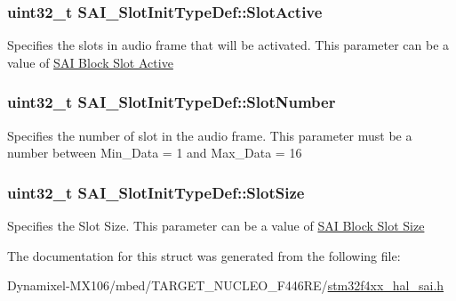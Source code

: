 \subsubsection[{\texorpdfstring{Slot\+Active}{SlotActive}}]{\setlength{\rightskip}{0pt plus 5cm}uint32\+\_\+t S\+A\+I\+\_\+\+Slot\+Init\+Type\+Def\+::\+Slot\+Active}\hypertarget{struct_s_a_i___slot_init_type_def_ab507a029fad3a8a181d87c4d603b9952}{}\label{struct_s_a_i___slot_init_type_def_ab507a029fad3a8a181d87c4d603b9952}
Specifies the slots in audio frame that will be activated. This parameter can be a value of \hyperlink{group___s_a_i___block___slot___active}{S\+AI Block Slot Active} 
\subsubsection[{\texorpdfstring{Slot\+Number}{SlotNumber}}]{\setlength{\rightskip}{0pt plus 5cm}uint32\+\_\+t S\+A\+I\+\_\+\+Slot\+Init\+Type\+Def\+::\+Slot\+Number}\hypertarget{struct_s_a_i___slot_init_type_def_a476fd97f54e692d634222720d4d4ad6a}{}\label{struct_s_a_i___slot_init_type_def_a476fd97f54e692d634222720d4d4ad6a}
Specifies the number of slot in the audio frame. This parameter must be a number between Min\+\_\+\+Data = 1 and Max\+\_\+\+Data = 16 
\subsubsection[{\texorpdfstring{Slot\+Size}{SlotSize}}]{\setlength{\rightskip}{0pt plus 5cm}uint32\+\_\+t S\+A\+I\+\_\+\+Slot\+Init\+Type\+Def\+::\+Slot\+Size}\hypertarget{struct_s_a_i___slot_init_type_def_adebc14a2c9d30a8c13d2685bdb22d7af}{}\label{struct_s_a_i___slot_init_type_def_adebc14a2c9d30a8c13d2685bdb22d7af}
Specifies the Slot Size. This parameter can be a value of \hyperlink{group___s_a_i___block___slot___size}{S\+AI Block Slot Size} 

The documentation for this struct was generated from the following file\+:\begin{DoxyCompactItemize}
\item 
Dynamixel-\/\+M\+X106/mbed/\+T\+A\+R\+G\+E\+T\+\_\+\+N\+U\+C\+L\+E\+O\+\_\+\+F446\+R\+E/\hyperlink{stm32f4xx__hal__sai_8h}{stm32f4xx\+\_\+hal\+\_\+sai.\+h}\end{DoxyCompactItemize}
